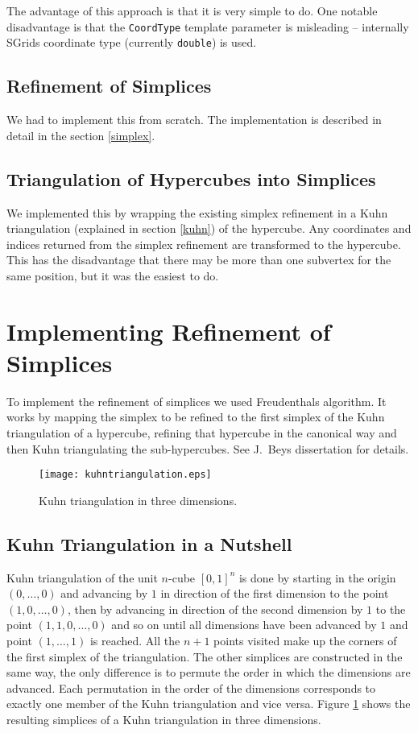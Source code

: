 \documentclass[english,a4paper]{article}
\newcommand{\code}[1]{\textnormal{\lstinline{#1}}}
\begin{document}
The advantage of this approach is that it is very simple to do.  One
notable disadvantage is that the \code{CoordType} template parameter is
misleading -- internally SGrids coordinate type (currently
\code{double}) is used.

\subsection{Refinement of Simplices}

We had to implement this from scratch.  The implementation is
described in detail in the section \ref{simplex}.

\subsection{Triangulation of Hypercubes into Simplices}

We implemented this by wrapping the existing simplex refinement in a
Kuhn triangulation (explained in section \ref{kuhn}) of the hypercube.
Any coordinates and indices returned from the simplex refinement are
transformed to the hypercube.  This has the disadvantage that there
may be more than one subvertex for the same position, but it was the
easiest to do.

\section{\label{simplex}Implementing Refinement of Simplices}

To implement the refinement of simplices we used Freudenthals
algorithm.  It works by mapping the simplex to be refined to the first
simplex of the Kuhn triangulation of a hypercube, refining that
hypercube in the canonical way and then Kuhn triangulating the
sub-hypercubes. See J.~Beys dissertation\cite{jbey} for details.

\begin{figure}
  \centering
  \texttt{[image: kuhntriangulation.eps]}
  \caption{\label{kuhntria}Kuhn triangulation in three dimensions.}
\end{figure}

\subsection{\label{kuhn}Kuhn Triangulation in a Nutshell}

Kuhn triangulation of the unit $n$-cube $[0, 1]^n$ is done by starting
in the origin $(0, \ldots, 0)$ and advancing by $1$ in direction of
the first dimension to the point $(1, 0, \ldots, 0)$, then by
advancing in direction of the second dimension by $1$ to the point
$(1, 1, 0, \ldots, 0)$ and so on until all dimensions have been
advanced by $1$ and point $(1, \ldots, 1)$ is reached.  All the $n+1$
points visited make up the corners of the first simplex of the
triangulation.  The other simplices are constructed in the same way,
the only difference is to permute the order in which the dimensions
are advanced.  Each permutation in the order of the dimensions
corresponds to exactly one member of the Kuhn triangulation and vice
versa.  Figure \ref{kuhntria} shows the resulting simplices of a Kuhn
triangulation in three dimensions.
\end{document}
